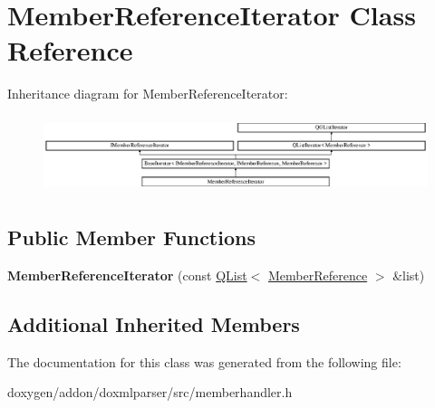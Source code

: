 \hypertarget{class_member_reference_iterator}{}\section{Member\+Reference\+Iterator Class Reference}
\label{class_member_reference_iterator}
Inheritance diagram for Member\+Reference\+Iterator\+:\begin{figure}[H]
\begin{center}
\leavevmode
\includegraphics[height=2.281059cm]{class_member_reference_iterator}
\end{center}
\end{figure}
\subsection*{Public Member Functions}
\begin{DoxyCompactItemize}
\item 
\mbox{\label{class_member_reference_iterator_a74cb52bc603f5f07bf3c9ebcf9d99d27}} 
{\bfseries Member\+Reference\+Iterator} (const \mbox{\hyperlink{class_q_list}{Q\+List}}$<$ \mbox{\hyperlink{class_member_reference}{Member\+Reference}} $>$ \&list)
\end{DoxyCompactItemize}
\subsection*{Additional Inherited Members}


The documentation for this class was generated from the following file\+:\begin{DoxyCompactItemize}
\item 
doxygen/addon/doxmlparser/src/memberhandler.\+h\end{DoxyCompactItemize}
